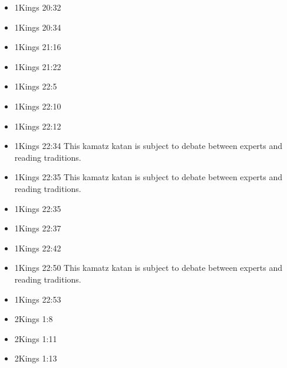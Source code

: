 \documentclass[14pt]{article}
\begin{document}
\begin{multicols}{2}
\begin{itemize}
											\item 1Kings 20:32
											
											\item 1Kings 20:34
											
											\item 1Kings 21:16
											
											\item 1Kings 21:22
											
											\item 1Kings 22:5
											
											\item 1Kings 22:10
											
											\item 1Kings 22:12
											
											\item 1Kings 22:34 This kamatz katan is subject to debate between experts and reading traditions.
											
											\item 1Kings 22:35 This kamatz katan is subject to debate between experts and reading traditions.
											
											\item 1Kings 22:35
											
											\item 1Kings 22:37
											
											\item 1Kings 22:42
											
											\item 1Kings 22:50 This kamatz katan is subject to debate between experts and reading traditions.
											
											\item 1Kings 22:53
											
											\item 2Kings 1:8
											
											\item 2Kings 1:11
											
											\item 2Kings 1:13
											

\end{itemize}
\end{multicols}
\end{document}
